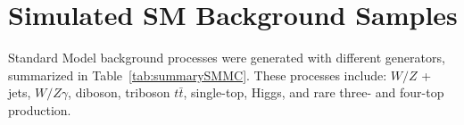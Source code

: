  \section{Simulated SM Background Samples}
 \label{sec:simbkg}
 Standard Model background processes were generated with different generators, summarized in Table~\ref{tab:summarySMMC}.  These processes include: $W/Z$ + jets, $W/Z\gamma$, diboson, triboson $t\bar t$, single-top, Higgs, and rare three- and four-top production.   %
 
 
 
